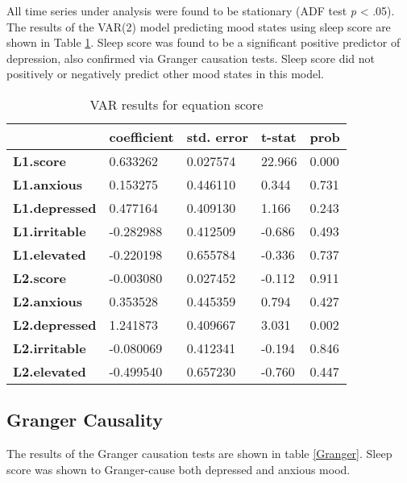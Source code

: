 \documentclass{article}
\begin{document}
All time series under analysis were found to be stationary (ADF test \textit{p}
< .05). The results of the VAR(2) model predicting mood states using sleep score
are shown in Table \ref{VARScoreResults}. Sleep score was found to be a
significant positive predictor of depression, also confirmed via Granger
causation tests. Sleep score did not positively or negatively predict other mood
states in this model.

\begin{table}[hb]
    \centering
    \begin{tabular}{lllll}
      \toprule
       ~ & \textbf{coefficient} & \textbf{std. error} & \textbf{t-stat} & \textbf{prob} \\ \midrule
        \textbf{L1.score} & 0.633262 & 0.027574 & 22.966 & 0.000 \\
        \textbf{L1.anxious} & 0.153275 & 0.446110 & 0.344 & 0.731 \\
        \textbf{L1.depressed} & 0.477164 & 0.409130 & 1.166 & 0.243 \\
        \textbf{L1.irritable} & -0.282988 & 0.412509 & -0.686 & 0.493 \\
        \textbf{L1.elevated} & -0.220198 & 0.655784 & -0.336 & 0.737 \\
        \textbf{L2.score} & -0.003080 & 0.027452 & -0.112 & 0.911 \\
        \textbf{L2.anxious} & 0.353528 & 0.445359 & 0.794 & 0.427 \\
        \textbf{L2.depressed} & 1.241873 & 0.409667 & 3.031 & 0.002 \\
        \textbf{L2.irritable} & -0.080069 & 0.412341 & -0.194 & 0.846 \\
        \textbf{L2.elevated} & -0.499540 & 0.657230 & -0.760 & 0.447 \\
        \bottomrule
    \end{tabular}
    \caption{VAR results for equation score}
    \label{VARScoreResults}
\end{table}

\hypertarget{granger-causality-1}{%
\subsection{Granger Causality}\label{granger-causality-1}}

The results of the Granger causation tests are shown in table \ref{Granger}.
Sleep score was shown to Granger-cause both depressed and anxious mood.
\end{document}
